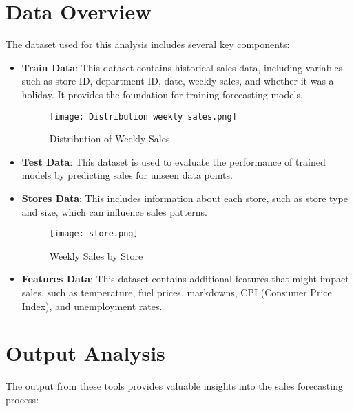 \documentclass{article}
\begin{document}
\section{Data Overview}
The dataset used for this analysis includes several key components:

\begin{itemize}
    \item \textbf{Train Data}: This dataset contains historical sales data, including variables such as store ID, department ID, date, weekly sales, and whether it was a holiday. It provides the foundation for training forecasting models.
    
    \begin{figure}[h]
        \centering
        \texttt{[image: Distribution weekly sales.png]}
        \caption{Distribution of Weekly Sales}
        \label{fig:weekly_sales_dist}
    \end{figure}
    
    \item \textbf{Test Data}: This dataset is used to evaluate the performance of trained models by predicting sales for unseen data points.
    \item \textbf{Stores Data}: This includes information about each store, such as store type and size, which can influence sales patterns.
    
    \begin{figure}[h]
        \centering
        \texttt{[image: store.png]}
        \caption{Weekly Sales by Store}
        \label{fig:sales_by_store}
    \end{figure}
    
    \item \textbf{Features Data}: This dataset contains additional features that might impact sales, such as temperature, fuel prices, markdowns, CPI (Consumer Price Index), and unemployment rates.
\end{itemize}

\section{Output Analysis}
The output from these tools provides valuable insights into the sales forecasting process:
\end{document}
